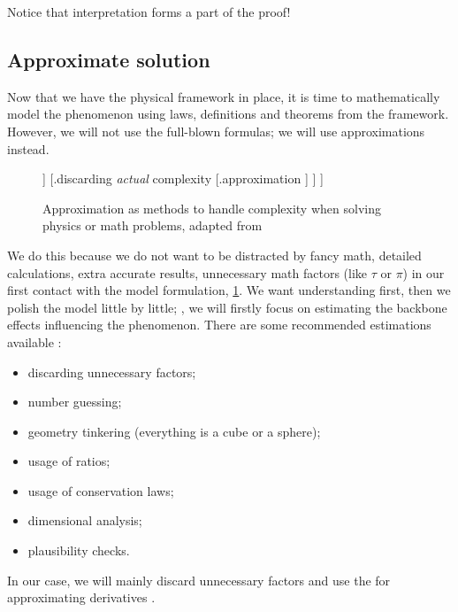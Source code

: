 Notice that interpretation forms a part of the proof!


\subsection{Approximate solution}\label{sec:approxsolution}
%
Now that we have the physical framework in place, it is time to mathematically model the phenomenon using laws, definitions and theorems from the framework. However, we will not use the full-blown formulas; we will use approximations instead.
%
%
%
\begin{figure}[bt]
  \capstart
  \begin{center}
  \footnotesize
    \Tree [.{how to handle complexity} 
            [.{discarding \emph{fake} complexity (symmetry)} 
              [.{dimensional analysis} ]
            ] 
            [.{discarding \emph{actual} complexity} 
              [.{approximation} ] 
            ]
           ]
  \normalsize
  \end{center}
  \caption[Handling complexity, again]
    {Approximation as methods to handle complexity when solving physics or math problems, adapted from \cite[p. 2]{sanjoy:2008}}
  \label{fig:handlingcomplexitytwo}
\end{figure}
%

We do this because we do not want to be distracted by fancy math, detailed calculations, extra accurate results, unnecessary math factors (like $\tau$ or $\pi$) in our first contact with the model formulation, \vide \cref{fig:handlingcomplexitytwo}. We want understanding first, then we polish the model little by little; \ie, we will firstly focus on estimating the backbone effects influencing the phenomenon. There are some recommended estimations available \cite{francis:1999}:
%
\begin{itemize}
%
\item discarding unnecessary factors;
%
\item number guessing;
%
\item geometry tinkering (everything is a cube or a sphere);
%
\item usage of ratios;
%
\item usage of conservation laws;
%
\item dimensional analysis;
%
\item plausibility checks.
%
\end{itemize}
%
In our case, we will mainly discard unnecessary factors and use the  for approximating derivatives \cite[p. 38]{sanjoy:2010}.

